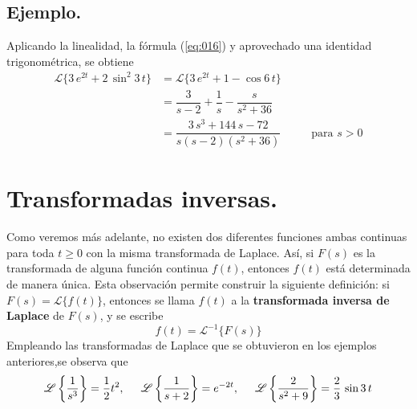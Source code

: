 \subsection*{Ejemplo.}
Aplicando la linealidad, la fórmula (\ref{eq:016}) y aprovechado una identidad trigonométrica, se obtiene
\begin{align*}
\mathscr{L} \{ 3 \, e^{2t} + 2 \, \sin^{2} 3 \, t \} &= \mathscr{L} \{ 3 \, e^{2t} + 1 - \cos 6 \, t \} \\[0.5em]
&= \dfrac{3}{s - 2} + \dfrac{1}{s} - \dfrac{s}{s^{2} + 36} \\[0.5em]
&= \dfrac{3 \, s^{3} + 144 \, s - 72}{s(s - 2)(s^{2} +  36)} \hspace{1cm} \mbox{ para } s > 0
\end{align*}
\section{Transformadas inversas.}
Como veremos más adelante, no existen dos diferentes funciones ambas continuas para toda $t \geq 0$ con la misma transformada de Laplace. Así, si $F(s)$ es la transformada de alguna función continua $f(t)$, entonces $f(t)$ está determinada de manera única. Esta observación permite construir la siguiente definición: si $F(s) = \mathscr{L}
 \{ f(t) \}$, entonces se llama $f(t)$ a la \textbf{transformada inversa de Laplace} de $F(s)$, y se escribe
\begin{equation}
f(t) = \mathscr{L}^{-1} \{ F(s) \}
\label{eq:018}
\end{equation}
Empleando las transformadas de Laplace que se obtuvieron en los ejemplos anteriores,se observa que
\[ \mathscr{L} \left\lbrace \dfrac{1}{s^{3}} \right\rbrace = \dfrac{1}{2} t^{2}, \hspace{0.5cm} \mathscr{L} \left\lbrace \dfrac{1}{s + 2} \right\rbrace = e^{-2t}, \hspace{0.5cm} \mathscr{L} \left\lbrace \dfrac{2}{s^{2} + 9} \right\rbrace = \dfrac{2}{3} \, \sin 3 \, t \]
